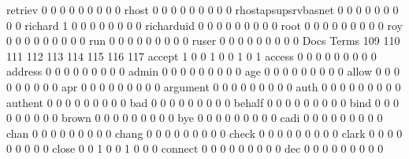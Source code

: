 \documentclass[compress,8pt]{beamer}
\begin{document}
\begin{frame}
\begin{Schunk}
  retriev                                    0   0   0   0   0   0   0   0   0
  rhost                                      0   0   0   0   0   0   0   0   0
  rhostapsupsrvbasnet                        0   0   0   0   0   0   0   0   0
  richard                                    1   0   0   0   0   0   0   0   0
  richarduid                                 0   0   0   0   0   0   0   0   0
  root                                       0   0   0   0   0   0   0   0   0
  roy                                        0   0   0   0   0   0   0   0   0
  run                                        0   0   0   0   0   0   0   0   0
  ruser                                      0   0   0   0   0   0   0   0   0
                                          Docs
Terms                                      109 110 111 112 113 114 115 116 117
  accept                                     1   0   0   1   0   0   1   0   1
  access                                     0   0   0   0   0   0   0   0   0
  address                                    0   0   0   0   0   0   0   0   0
  admin                                      0   0   0   0   0   0   0   0   0
  age                                        0   0   0   0   0   0   0   0   0
  allow                                      0   0   0   0   0   0   0   0   0
  apr                                        0   0   0   0   0   0   0   0   0
  argument                                   0   0   0   0   0   0   0   0   0
  auth                                       0   0   0   0   0   0   0   0   0
  authent                                    0   0   0   0   0   0   0   0   0
  bad                                        0   0   0   0   0   0   0   0   0
  behalf                                     0   0   0   0   0   0   0   0   0
  bind                                       0   0   0   0   0   0   0   0   0
  brown                                      0   0   0   0   0   0   0   0   0
  bye                                        0   0   0   0   0   0   0   0   0
  cadi                                       0   0   0   0   0   0   0   0   0
  chan                                       0   0   0   0   0   0   0   0   0
  chang                                      0   0   0   0   0   0   0   0   0
  check                                      0   0   0   0   0   0   0   0   0
  clark                                      0   0   0   0   0   0   0   0   0
  close                                      0   0   1   0   0   1   0   0   0
  connect                                    0   0   0   0   0   0   0   0   0
  dec                                        0   0   0   0   0   0   0   0   0

\end{Schunk}
\end{frame}
\end{document}
